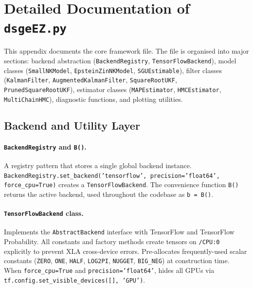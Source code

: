 \documentclass[11pt,a4paper]{article}
\theoremstyle{definition}
\newcommand{\code}[1]{\texttt{\color{codecolor}#1}}
\begin{document}
	
	
	\appendix
	
	\section{Detailed Documentation of \code{dsgeEZ.py}}
	\label{app:dsgeEZ}
	
	This appendix documents the core framework file.
	The file is organised into major sections: backend abstraction (\code{BackendRegistry}, \code{TensorFlowBackend}), model classes (\code{SmallNKModel}, \code{EpsteinZinNKModel}, \code{SGUEstimable}), filter classes (\code{KalmanFilter}, \code{AugmentedKalmanFilter}, \code{SquareRootUKF}, \code{PrunedSquareRootUKF}), estimator classes (\code{MAPEstimator}, \code{HMCEstimator}, \code{MultiChainHMC}), diagnostic functions, and plotting utilities.
	
	\subsection{Backend and Utility Layer}
	\label{app:dsgeEZ_backend}
	
	\paragraph{\code{BackendRegistry} and \code{B()}.}
	A registry pattern that stores a single global backend instance.
	\code{BackendRegistry.set\_backend('tensorflow', precision='float64', force\_cpu=True)} creates a \code{TensorFlowBackend}.
	The convenience function \code{B()} returns the active backend, used throughout the codebase as \code{b = B()}.
	
	\paragraph{\code{TensorFlowBackend} class.}
	Implements the \code{AbstractBackend} interface with TensorFlow and TensorFlow Probability.
	All constants and factory methods create tensors on \code{/CPU:0} explicitly to prevent XLA cross-device errors.
	Pre-allocates frequently-used scalar constants (\code{ZERO}, \code{ONE}, \code{HALF}, \code{LOG2PI}, \code{NUGGET}, \code{BIG\_NEG}) at construction time.
	When \code{force\_cpu=True} and \code{precision='float64'}, hides all GPUs via \code{tf.config.set\_visible\_devices([], 'GPU')}.
	
\end{document}
